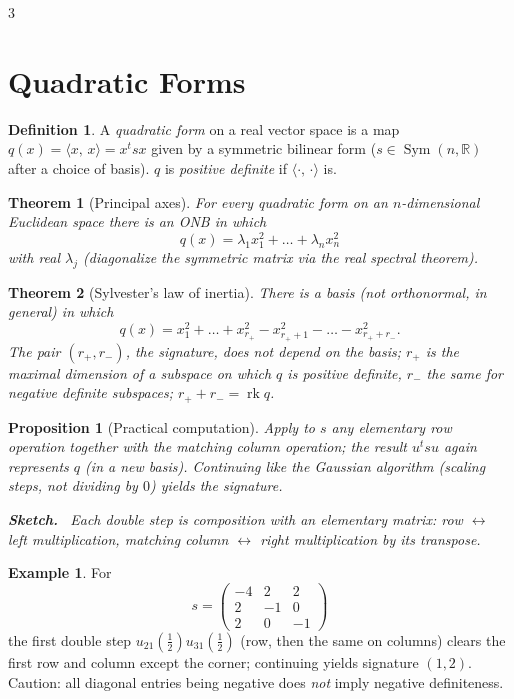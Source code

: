 \documentclass[10pt,a4paper,landscape]{article}
\theoremstyle{definition}
\newtheorem{defn}{Definition}[section]
\newtheorem{exm}{Example}[section]
\theoremstyle{plain}
\newtheorem{thm}{Theorem}[section]
\newtheorem{prop}{Proposition}[section]
\theoremstyle{remark}
\newcommand{\R}{\mathbb{R}}
\DeclareMathOperator{\Sym}{Sym}
\DeclareMathOperator{\rk}{rk}
\newcommand{\ip}[2]{\langle #1,\, #2 \rangle}
\newenvironment{proofsketch}{%
  \par\small\color{exgray}\textbf{Sketch.}\ }%
  {\par}
\begin{document}
\begin{multicols*}{3}
\section{Quadratic Forms}

\begin{defn}
A \emph{quadratic form} on a real vector space is a map $q(x) = \ip{x}{x} = x^t s x$ given by a symmetric bilinear form ($s \in \Sym(n, \R)$ after a choice of basis). $q$ is \emph{positive definite} if $\ip{\cdot}{\cdot}$ is.
\end{defn}

\begin{thm}[Principal axes]
For every quadratic form on an $n$-dimensional Euclidean space there is an ONB in which
\[
q(x) = \lambda_1 x_1^2 + \dots + \lambda_n x_n^2
\]
with real $\lambda_j$ (diagonalize the symmetric matrix via the real spectral theorem).
\end{thm}

\begin{thm}[Sylvester's law of inertia]
There is a basis (not orthonormal, in general) in which
\[
q(x) = x_1^2 + \dots + x_{r_+}^2 - x_{r_+ + 1}^2 - \dots - x_{r_+ + r_-}^2 .
\]
The pair $(r_+, r_-)$, the \emph{signature}, does not depend on the basis; $r_+$ is the maximal dimension of a subspace on which $q$ is positive definite, $r_-$ the same for negative definite subspaces; $r_+ + r_- = \rk q$.
\end{thm}

\begin{prop}[Practical computation]
Apply to $s$ any elementary row operation together with the matching column operation; the result $u^t s u$ again represents $q$ (in a new basis). Continuing like the Gaussian algorithm (scaling steps, not dividing by $0$) yields the signature.
\begin{proofsketch}
Each double step is composition with an elementary matrix: row $\leftrightarrow$ left multiplication, matching column $\leftrightarrow$ right multiplication by its transpose.
\end{proofsketch}
\end{prop}

\begin{exm}
For
\[
s = \begin{pmatrix} -4 & 2 & 2 \\ 2 & -1 & 0 \\ 2 & 0 & -1 \end{pmatrix}
\]
the first double step $u_{21}(\tfrac12)u_{31}(\tfrac12)$ (row, then the same on columns) clears the first row and column except the corner; continuing yields signature $(1, 2)$. Caution: all diagonal entries being negative does \emph{not} imply negative definiteness.
\end{exm}


\end{multicols*}
\end{document}
